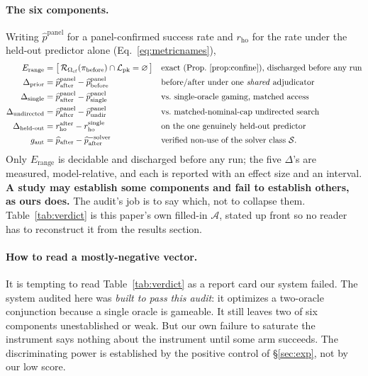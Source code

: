\documentclass[11pt]{article}
\newcommand{\PK}{\ensuremath{\mathcal{L}_{\mathrm{pk}}}}
\newcommand{\Ocf}{\ensuremath{\Omega_{\mathrm{cf}}}}
\newcommand{\Rze}[2]{\ensuremath{\mathcal{R}_{#1}(#2)}}
\begin{document}
\paragraph{The six components.} Writing $\widehat p^{\mathrm{panel}}$ for a panel-confirmed success rate
and $r_{\mathrm{ho}}$ for the rate under the held-out predictor alone (Eq.~\eqref{eq:metricnames}),
\begin{equation}\label{eq:cert}
\begin{aligned}
E_{\mathrm{range}} &= \bigl[\,\Rze{\Ocf}{\pi_{\mathrm{before}}}\cap\PK=\varnothing\,\bigr]
  &&\text{exact (Prop.~\ref{prop:confine}), discharged before any run}\\
\Delta_{\mathrm{prior}} &= \widehat p^{\mathrm{panel}}_{\mathrm{after}}-\widehat p^{\mathrm{panel}}_{\mathrm{before}}
  &&\text{before/after under one \emph{shared} adjudicator}\\
\Delta_{\mathrm{single}} &= \widehat p^{\mathrm{panel}}_{\mathrm{after}}-\widehat p^{\mathrm{panel}}_{\mathrm{single}}
  &&\text{vs.\ single-oracle gaming, matched access}\\
\Delta_{\mathrm{undirected}} &= \widehat p^{\mathrm{panel}}_{\mathrm{after}}-\widehat p^{\mathrm{panel}}_{\mathrm{undir}}
  &&\text{vs.\ matched-nominal-cap undirected search}\\
\Delta_{\mathrm{held\text{-}out}} &= r_{\mathrm{ho}}^{\mathrm{after}}-r_{\mathrm{ho}}^{\mathrm{single}}
  &&\text{on the one genuinely held-out predictor}\\
g_{\mathrm{aut}} &= \widehat p_{\mathrm{after}}-\widehat p^{-\mathrm{solver}}_{\mathrm{after}}
  &&\text{verified non-use of the solver class }\mathcal S .
\end{aligned}
\end{equation}
Only $E_{\mathrm{range}}$ is decidable and discharged before any run; the five $\Delta$'s are measured,
model-relative, and each is reported with an effect size and an interval. \textbf{A study may establish some
components and fail to establish others, as ours does.} The audit's job is to say which, not to collapse
them. Table~\ref{tab:verdict} is this paper's own filled-in $\mathcal A$, stated up front so no reader has to
reconstruct it from the results section.

\paragraph{How to read a mostly-negative vector.} It is tempting to read Table~\ref{tab:verdict} as a report
card our system failed. The system audited here was \emph{built to pass this audit}: it optimizes a
two-oracle conjunction because a single oracle is gameable. It still leaves two of six components
unestablished or weak. But our own failure to saturate the instrument says nothing about the
instrument until some arm succeeds. The discriminating power is established by the positive control of
\S\ref{sec:exp}, not by our low score.
\end{document}
